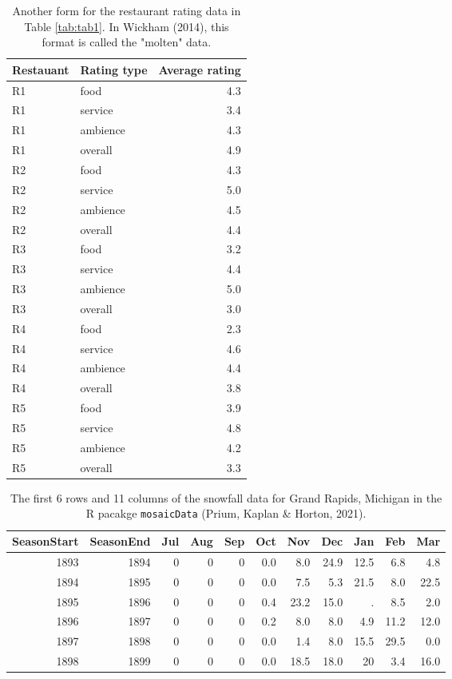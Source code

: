 \documentclass[10pt,a4paper,onecolumn]{article}
\begin{document}
\begin{table}

\caption{\label{tab:tab2}Another form for the restaurant rating data in Table \ref{tab:tab1}. In Wickham (2014), this format is called the "molten" data.}
\centering
\begin{tabular}[t]{llr}
\toprule
Restauant & Rating type & Average rating\\
\midrule
R1 & food & 4.3\\
R1 & service & 3.4\\
R1 & ambience & 4.3\\
R1 & overall & 4.9\\
R2 & food & 4.3\\
R2 & service & 5.0\\
R2 & ambience & 4.5\\
R2 & overall & 4.4\\
R3 & food & 3.2\\
R3 & service & 4.4\\
R3 & ambience & 5.0\\
R3 & overall & 3.0\\
R4 & food & 2.3\\
R4 & service & 4.6\\
R4 & ambience & 4.4\\
R4 & overall & 3.8\\
R5 & food & 3.9\\
R5 & service & 4.8\\
R5 & ambience & 4.2\\
R5 & overall & 3.3\\
\bottomrule
\end{tabular}
\end{table}

\begin{table}

\caption{\label{tab:tab3}The first 6 rows and 11 columns of the snowfall data for Grand Rapids, Michigan in the R pacakge  \texttt{mosaicData} (Prium, Kaplan \& Horton, 2021).}
\centering
\begin{tabular}[t]{rrrrrrrrrrr}
\toprule
SeasonStart & SeasonEnd & Jul & Aug & Sep & Oct & Nov & Dec & Jan & Feb & Mar\\
\midrule
1893 & 1894 & 0 & 0 & 0 & 0.0 & 8.0 & 24.9 & 12.5 & 6.8 & 4.8\\
1894 & 1895 & 0 & 0 & 0 & 0.0 & 7.5 & 5.3 & 21.5 & 8.0 & 22.5\\
1895 & 1896 & 0 & 0 & 0 & 0.4 & 23.2 & 15.0 & . & 8.5 & 2.0\\
1896 & 1897 & 0 & 0 & 0 & 0.2 & 8.0 & 8.0 & 4.9 & 11.2 & 12.0\\
1897 & 1898 & 0 & 0 & 0 & 0.0 & 1.4 & 8.0 & 15.5 & 29.5 & 0.0\\
1898 & 1899 & 0 & 0 & 0 & 0.0 & 18.5 & 18.0 & 20 & 3.4 & 16.0\\
\bottomrule
\end{tabular}
\end{table}
\end{document}
